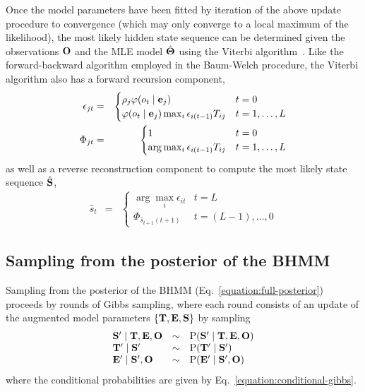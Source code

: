 \documentclass[aps,pre,twocolumn,superscriptaddress,nofootinbib,longbibliography]{revtex4-1}
\newcommand{\bfm}[1]{{\bf #1}}
\renewcommand{\Pr}{\mathrm{P}}
\begin{document}
{Once the model parameters have been fitted by iteration of the above update procedure to convergence (which may only converge to a local maximum of the likelihood), the most likely hidden state sequence can be determined given the observations $\bfm{O}$ and the MLE model $\hat{\bfm{\Theta}}$ using the Viterbi algorithm~\cite{viterbi:1967:IEEE-trans-info-theory:viterbi-algorithm}.
Like the forward-backward algorithm employed in the Baum-Welch procedure, the Viterbi algorithm also has a forward recursion component,
\begin{eqnarray}
\epsilon_{jt} &=& \begin{cases}
\rho_j \varphi(o_t \mid \bfm{e}_j) & t = 0 \\
\varphi(o_t \mid \bfm{e}_j) \max_{i} \epsilon_{i(t-1)} T_{ij}  & t = 1,\ldots,L
\end{cases} \label{equation:viterbi-forward} \\
\Phi_{jt} &=& \begin{cases}
1 & t = 0 \\
\arg\max_{i} \epsilon_{i(t-1)} T_{ij}  & t = 1,\ldots,L
\end{cases} \nonumber
\end{eqnarray}
as well as a reverse reconstruction component to compute the most likely state sequence $\hat{\bfm{S}}$,
\begin{eqnarray}
\hat{s}_t &=& \begin{cases}
\arg\max_i \epsilon_{it} & t = L\\
\Phi_{\hat{s}_{t+1}(t+1)} & t = (L-1),\ldots,0
\end{cases} 
\end{eqnarray}

\subsection{Sampling from the posterior of the BHMM}
\label{section:algorithms:bhmm-posterior-sampling}

Sampling from the posterior of the BHMM (Eq.~\ref{equation:full-posterior}) proceeds by rounds of Gibbs sampling, where each round consists of an update of the augmented model parameters $\{\bfm{T}, \bfm{E}, \bfm{S}\}$ by sampling
\begin{eqnarray}
\begin{array}{lcl}
\bfm{S}' \mid \bfm{T}, \bfm{E}, \bfm{O} &\sim& \Pr(\bfm{S}' \mid \bfm{T}, \bfm{E}, \bfm{O}) \nonumber \\
\bfm{T}' \mid \bfm{S}' &\sim& \Pr(\bfm{T}' \mid \bfm{S}') \nonumber \\
\bfm{E}' \mid \bfm{S}', \bfm{O} &\sim& \Pr(\bfm{E}' \mid \bfm{S}', \bfm{O}) 
\end{array}
\end{eqnarray}
where the conditional probabilities are given by Eq.~\ref{equation:conditional-gibbs}.  

}
\end{document}
